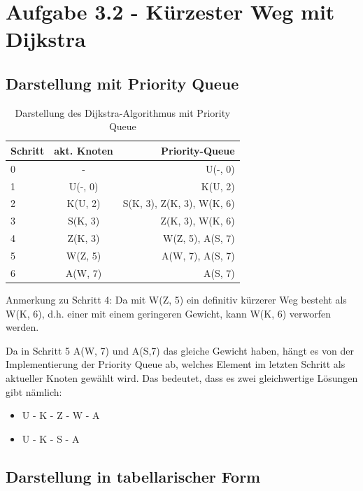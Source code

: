 \documentclass[12pt]{amsart}
\begin{document}
\section*{Aufgabe 3.2 - Kürzester Weg mit Dijkstra}

\subsection*{Darstellung mit Priority Queue}

\begin{table}[h]
   \centering
   \begin{tabular}{@{} lcr @{}} %
      \toprule
      Schritt    & akt. Knoten & Priority-Queue \\
      \midrule
      0   	& - 			& U(-, 0) \\
       1        & U(-, 0)  		&  K(U, 2) \\
      2       	& K(U, 2)  		& S(K, 3), Z(K, 3), W(K, 6) \\
      3       	& S(K, 3)  		& Z(K, 3), W(K, 6)\\
      4 	& Z(K, 3)   	&  W(Z, 5), A(S, 7) \\
      5   	& W(Z, 5) 		&  A(W, 7), A(S, 7) \\
      6     	&  A(W, 7)	 	&  A(S, 7) \\
        \bottomrule
   \end{tabular}
   \caption{Darstellung des Dijkstra-Algorithmus mit Priority Queue }
   \label{tab:booktabs}
\end{table}
Anmerkung zu Schritt 4: Da mit W(Z, 5) ein definitiv kürzerer Weg besteht als W(K, 6), d.h. einer mit einem geringeren Gewicht, kann W(K, 6) verworfen werden.

Da in Schritt 5 A(W, 7) und A(S,7) das gleiche Gewicht haben, hängt es von der Implementierung der Priority Queue ab, welches Element im letzten Schritt als aktueller Knoten gewählt wird. Das bedeutet, dass es zwei gleichwertige Lösungen gibt nämlich: \\
\begin{itemize}
\item U - K - Z - W - A 
\item U - K - S - A
\end{itemize}

\subsection*{Darstellung in tabellarischer Form }
\end{document}

